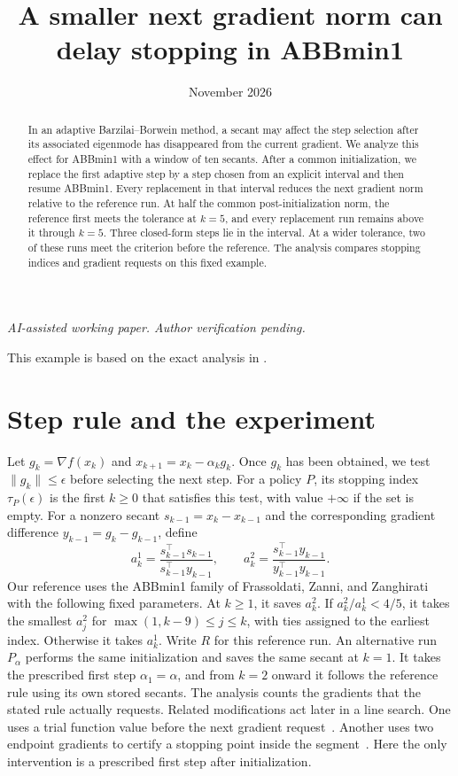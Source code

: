 \documentclass[11pt]{article}
\title{A smaller next gradient norm can delay stopping in ABBmin1}
\author{}
\date{November 2026}
\newcommand{\norm}[1]{\lVert#1\rVert}
\begin{document}
\maketitle
\begin{center}\small\emph{AI-assisted working paper. Author verification pending.}\end{center}
\begin{abstract}
In an adaptive Barzilai--Borwein method, a secant may affect the step
selection after its associated eigenmode has disappeared from the
current gradient. We analyze this effect for ABBmin1 with a window of
ten secants. After a common initialization, we replace the first
adaptive step by a step chosen from an explicit interval and then
resume ABBmin1. Every replacement in that interval reduces the next
gradient norm relative to the reference run. At half the common
post-initialization norm, the reference first meets the tolerance at
\(k=5\), and every replacement run remains above it through \(k=5\).
Three closed-form steps lie in the interval. At a wider tolerance, two
of these runs meet the criterion before the reference. The analysis
compares stopping indices and gradient requests on this fixed example.
\end{abstract}

This example is based on the exact analysis in \cite{source}.

\section{Step rule and the experiment}

Let \(g_k=\nabla f(x_k)\) and \(x_{k+1}=x_k-\alpha_k g_k\).
Once \(g_k\) has been obtained, we test \(\norm{g_k}\le\epsilon\) before
selecting the next step. For a policy \(P\), its stopping index \(\tau_P(\epsilon)\) is the
first \(k\ge0\) that satisfies this test, with value \(+\infty\) if
the set is empty.
For a nonzero secant \(s_{k-1}=x_k-x_{k-1}\) and the corresponding
gradient difference \(y_{k-1}=g_k-g_{k-1}\), define
\[
 a^1_k=\frac{s_{k-1}^{\top}s_{k-1}}{s_{k-1}^{\top}y_{k-1}},
 \qquad
 a^2_k=\frac{s_{k-1}^{\top}y_{k-1}}{y_{k-1}^{\top}y_{k-1}}.
\]
Our reference uses the ABBmin1 family of Frassoldati, Zanni, and Zanghirati
\cite{fzz} with the following fixed parameters. At \(k\ge1\), it saves
\(a^2_k\). If \(a^2_k/a^1_k<4/5\), it takes the smallest \(a^2_j\)
for \(\max(1,k-9)\le j\le k\), with ties assigned to the earliest index.
Otherwise it takes \(a^1_k\). Write \(R\) for this reference run.
An alternative run \(P_\alpha\) performs the same initialization and
saves the same secant at \(k=1\). It takes the prescribed first step
\(\alpha_1=\alpha\), and from \(k=2\) onward it follows the reference
rule using its own stored secants. The analysis counts the gradients
that the stated rule actually requests. Related modifications act
later in a line search. One uses a trial function value before the
next gradient request~\cite{trial}. Another uses two endpoint
gradients to certify a stopping point inside the segment~\cite{chord}.
Here the only intervention is a prescribed first step after
initialization.
\end{document}
